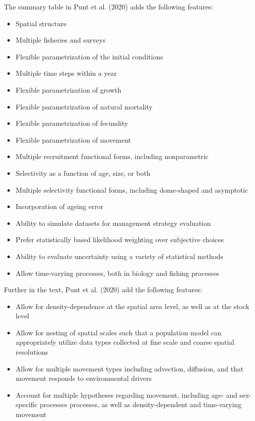 \documentclass{SCreport}
\begin{document}
\vspace{2ex}

The summary table in Punt et al. (2020) adds the following features:

\begin{itemize}
  \item Spatial structure
  \item Multiple fisheries and surveys
  \item Flexible parametrization of the initial conditions
  \item Multiple time steps within a year
  \item Flexible parametrization of growth
  \item Flexible parametrization of natural mortality
  \item Flexible parametrization of fecundity
  \item Flexible parametrization of movement
  \item Multiple recruitment functional forms, including nonparametric
  \item Selectivity as a function of age, size, or both
  \item Multiple selectivity functional forms, including dome-shaped and
  asymptotic
  \item Incorporation of ageing error
  \item Ability to simulate datasets for management strategy evaluation
  \item Prefer statistically based likelihood weighting over subjective choices
  \item Ability to evaluate uncertainty using a variety of statistical methods
  \item Allow time-varying processes, both in biology and fishing processes
\end{itemize}

\vspace{2ex}

Further in the text, Punt et al. (2020) add the following features:

\begin{itemize}
  \item Allow for density-dependence at the spatial area level, as well as at
  the stock level
  \item Allow for nesting of spatial scales such that a population model can
  appropriately utilize data types collected at fine scale and coarse spatial
  resolutions
  \item Allow for multiple movement types including advection, diffusion, and
  that movement responds to environmental drivers
  \item Account for multiple hypotheses regarding movement, including age- and
  sex-specific processes processes, as well as density-dependent and
  time-varying movement
\end{itemize}
\end{document}
